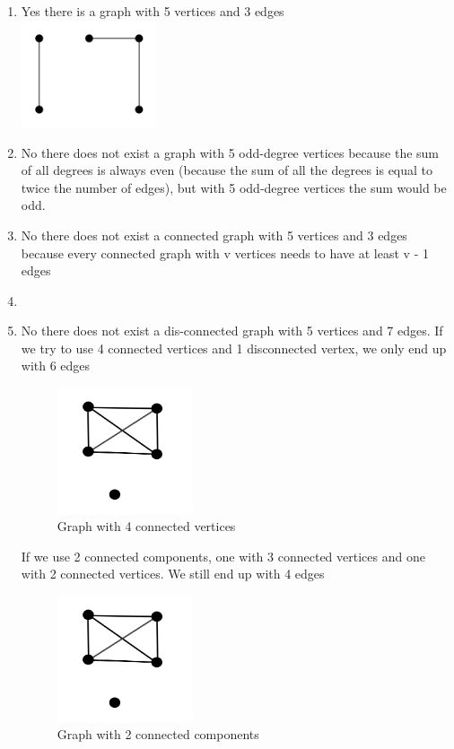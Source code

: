 \documentclass[10pt]{article}
\newenvironment{solution}[2][Solution]{ \begin{trivlist}
\item[\hskip \labelsep {\bfseries #1}]}{\end{trivlist}}
\begin{document}
\begin{solution}{3}
\item[]
\begin{enumerate}
\item Yes there is a graph with 5 vertices and 3 edges \\ \includegraphics[width=4cm]{graph1}
\item No there does not exist a graph with 5 odd-degree vertices because the sum of all degrees is always even (because the sum of all the degrees is equal to twice the number of edges), but with 5 odd-degree vertices the sum would be odd.
\item No there does not exist a connected graph with 5 vertices and 3 edges because every connected graph with v vertices needs to have at least v - 1 edges
\item 
\item No there does not exist a dis-connected graph with 5 vertices and 7 edges. If we try to use 4 connected vertices and 1 disconnected vertex, we only end up with 6 edges\\
\begin{figure}[H]
    \centering
    \caption{Graph with 4 connected vertices}
    \includegraphics[width=4cm]{graph2}
\end{figure}
\pagebreak
If we use 2 connected components, one with 3 connected vertices and one with 2 connected vertices. We still end up with 4 edges\\
\begin{figure}[H]
    \centering
    \caption{Graph with 2 connected components}
    \includegraphics[width=4cm]{graph2}
\end{figure}


\end{enumerate}
\end{solution}
\end{document}
